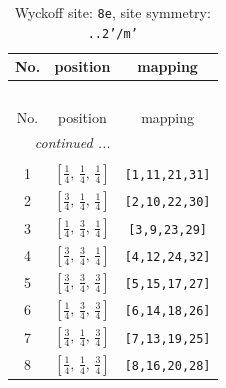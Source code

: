\documentclass[fleqn,8pt]{jsarticle}
\begin{document}
\renewcommand{\arraystretch}{1.2}
\begin{longtable}{ccc}
\caption{Wyckoff site: {\tt 8e}, site symmetry: {\tt ..2'/m'}}
 \\
 \hline \hline
No. & position & mapping \\ \hline \endfirsthead

\multicolumn{2}{l}{\tablename\ \thetable{}} \\
 \hline \hline
No. & position & mapping \\ \hline \endhead

 \hline \hline
\multicolumn{2}{r}{\footnotesize\it continued ...} \\ \endfoot

 \hline \hline
\multicolumn{2}{r}{} \\ \endlastfoot

1 & $\left[ \frac{1}{4},\, \frac{1}{4},\, \frac{1}{4} \right]$ & {\tt [1,11,21,31]} \\ \hline
2 & $\left[ \frac{3}{4},\, \frac{1}{4},\, \frac{1}{4} \right]$ & {\tt [2,10,22,30]} \\ \hline
3 & $\left[ \frac{1}{4},\, \frac{3}{4},\, \frac{1}{4} \right]$ & {\tt [3,9,23,29]} \\ \hline
4 & $\left[ \frac{3}{4},\, \frac{3}{4},\, \frac{1}{4} \right]$ & {\tt [4,12,24,32]} \\ \hline
5 & $\left[ \frac{3}{4},\, \frac{3}{4},\, \frac{3}{4} \right]$ & {\tt [5,15,17,27]} \\ \hline
6 & $\left[ \frac{1}{4},\, \frac{3}{4},\, \frac{3}{4} \right]$ & {\tt [6,14,18,26]} \\ \hline
7 & $\left[ \frac{3}{4},\, \frac{1}{4},\, \frac{3}{4} \right]$ & {\tt [7,13,19,25]} \\ \hline
8 & $\left[ \frac{1}{4},\, \frac{1}{4},\, \frac{3}{4} \right]$ & {\tt [8,16,20,28]} \\
\end{longtable}
\renewcommand{\arraystretch}{1.2}
\end{document}
